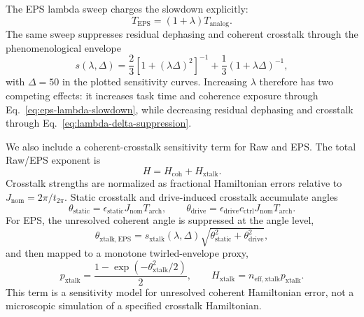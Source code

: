 The EPS lambda sweep charges the slowdown explicitly:
\begin{equation}
T_{\mathrm{EPS}}
=(1+\lambda)T_{\mathrm{analog}}.
\label{eq:eps-lambda-slowdown}
\end{equation}
The same sweep suppresses residual dephasing and coherent crosstalk through the
phenomenological envelope
\begin{equation}
s(\lambda,\Delta)
=\frac{2}{3}\left[1+(\lambda\Delta)^2\right]^{-1}
+\frac{1}{3}(1+\lambda\Delta)^{-1},
\label{eq:lambda-delta-suppression}
\end{equation}
with \(\Delta=50\) in the plotted sensitivity curves. Increasing \(\lambda\)
therefore has two competing effects: it increases task time and coherence
exposure through Eq.~\eqref{eq:eps-lambda-slowdown}, while decreasing residual
dephasing and crosstalk through Eq.~\eqref{eq:lambda-delta-suppression}.

We also include a coherent-crosstalk sensitivity term for Raw and EPS. The total
Raw/EPS exponent is
\begin{equation}
H = H_{\mathrm{coh}} + H_{\mathrm{xtalk}}.
\end{equation}
Crosstalk strengths are normalized as fractional Hamiltonian errors relative to
\(J_{\mathrm{nom}}=2\pi/t_{2\pi}\). Static crosstalk and drive-induced crosstalk
accumulate angles
\begin{equation}
\theta_{\mathrm{static}}
=\epsilon_{\mathrm{static}}J_{\mathrm{nom}}T_{\mathrm{arch}},
\qquad
\theta_{\mathrm{drive}}
=\epsilon_{\mathrm{drive}}c_{\mathrm{ctrl}}J_{\mathrm{nom}}T_{\mathrm{arch}}.
\end{equation}
For EPS, the unresolved coherent angle is suppressed at the angle level,
\begin{equation}
\theta_{\mathrm{xtalk,EPS}}
=s_{\mathrm{xtalk}}(\lambda,\Delta)
\sqrt{\theta_{\mathrm{static}}^2+\theta_{\mathrm{drive}}^2},
\end{equation}
and then mapped to a monotone twirled-envelope proxy,
\begin{equation}
p_{\mathrm{xtalk}}
=\frac{1-\exp(-\theta_{\mathrm{xtalk}}^2/2)}{2},
\qquad
H_{\mathrm{xtalk}}
=n_{\mathrm{eff,xtalk}}p_{\mathrm{xtalk}}.
\end{equation}
This term is a sensitivity model for unresolved coherent Hamiltonian error, not
a microscopic simulation of a specified crosstalk Hamiltonian.

